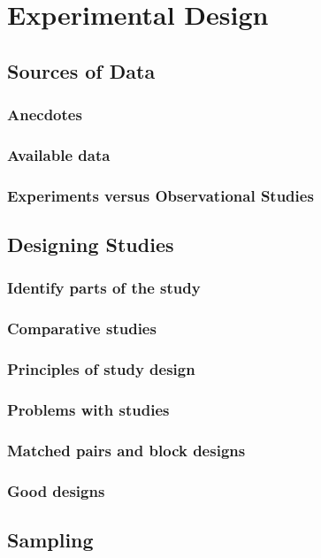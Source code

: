 \chapter{Experimental Design}  %

\section{Sources of Data}  %
    \subsection{Anecdotes}  %
    \subsection{Available data}  %
    \subsection{Experiments versus Observational Studies}  %

\section{Designing Studies}  %
    \subsection{Identify parts of the study}  %
    \subsection{Comparative studies}  %
    \subsection{Principles of study design}  %
    \subsection{Problems with studies}  %
    \subsection{Matched pairs and block designs}  %
    \subsection{Good designs}  %

\section{Sampling}  %
